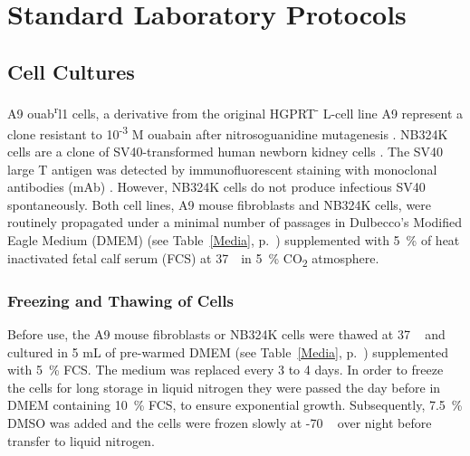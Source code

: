 
\chapter{Standard Laboratory Protocols} %

\label{ChapterX} %



\section{Cell Cultures}
A9 ouab\textsuperscript{r}l1 cells, a derivative from the original HGPRT\textsuperscript{-} L-cell line A9 represent a clone resistant to 10\textsuperscript{-3} M ouabain after nitrosoguanidine mutagenesis \cite{pmid6602222, pmid14213660}.
NB324K cells are a clone of SV40-transformed  human newborn kidney cells \cite{pmid13911591}. The SV40 large T antigen was detected by immunofluorescent  staining with monoclonal antibodies (mAb) \cite{pmid6169844}.  However, NB324K cells do not produce infectious SV40 spontaneously.
Both cell lines, A9 mouse fibroblasts and NB324K cells, were routinely propagated under a minimal number of passages in Dulbecco's Modified Eagle Medium (DMEM) (see Table~\ref{Media}, p.~\pageref{Media}) supplemented with 5~\% of heat inactivated fetal calf serum (FCS) at 37~\textcelsius~in 5~\% CO\textsubscript{2} atmosphere.


\subsection{Freezing and Thawing of Cells}
Before use, the A9 mouse fibroblasts or NB324K cells were thawed at 37 \textcelsius~ and cultured in 5 mL of pre-warmed DMEM (see Table~\ref{Media}, p.~\pageref{Media}) supplemented with 5~\% FCS. The medium was replaced every 3 to 4 days. 
In order to freeze the cells for long storage in liquid nitrogen they were passed the day before in DMEM containing 10~\% FCS, to ensure exponential growth. Subsequently, 7.5~\% DMSO was added and the cells were frozen slowly at -70 \textcelsius~ over night before transfer to liquid nitrogen.

